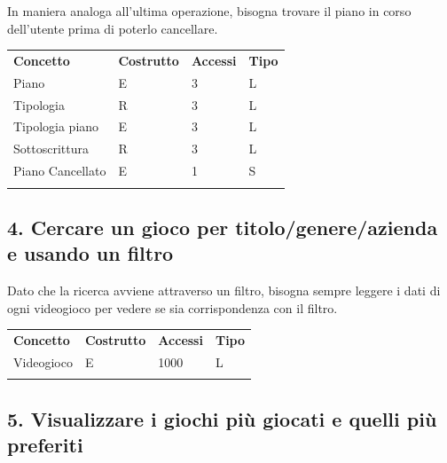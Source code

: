 \documentclass[a4paper,12pt]{report}
\begin{document}
In maniera analoga all'ultima operazione, bisogna trovare il piano in corso dell'utente prima di poterlo cancellare.

\newpage

\begin{table}[!htb]
\begin{center}
	\begin{tabular}{ | m{4cm} P{4cm} P{4cm} P{4cm} | }
	 \textbf{Concetto} & \textbf{Costrutto} & \textbf{Accessi} & \textbf{Tipo} \\
	Piano    		 & E & 3 & L \\ \hline
	Tipologia		 & R & 3 & L \\ \hline
	Tipologia piano  & E & 3 & L \\ \hline
	Sottoscrittura   & R & 3 & L \\ \hline
	Piano Cancellato & E & 1 & S \\ \hline
	  \\ \hline
	\end{tabular}
\end{center}
\end{table}


\subsection*{4. Cercare un gioco per titolo/genere/azienda e usando un filtro}

Dato che la ricerca avviene attraverso un filtro, bisogna sempre leggere i dati di ogni videogioco per vedere se sia corrispondenza con il filtro.

\begin{table}[h!]
\begin{center}
	\begin{tabular}{ | m{4cm} P{4cm} P{4cm} P{4cm} | }
	 \textbf{Concetto} & \textbf{Costrutto} & \textbf{Accessi} & \textbf{Tipo} \\
	Videogioco       & E & 1000 & L \\ \hline
	  \\ \hline
	\end{tabular}
\end{center}
\end{table}

\subsection*{5. Visualizzare i giochi più giocati e quelli più preferiti}
\end{document}
